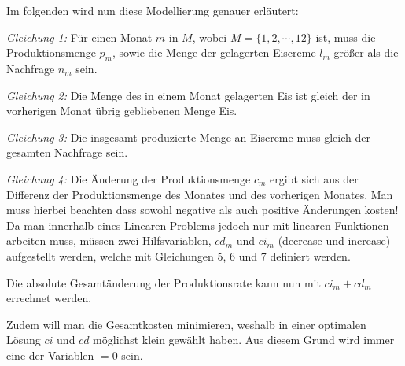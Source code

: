Im folgenden wird nun diese Modellierung genauer erläutert:

\emph{Gleichung 1:} Für einen Monat $m$ in $M$, wobei $M = \{1, 2, \cdots, 12\}$ ist, muss die Produktionsmenge $p_m$, sowie die Menge der gelagerten Eiscreme $l_m$ größer als die Nachfrage $n_m$ sein.

\emph{Gleichung 2:} Die Menge des in einem Monat gelagerten Eis ist gleich der in vorherigen Monat übrig gebliebenen Menge Eis.

\emph{Gleichung 3:} Die insgesamt produzierte Menge an Eiscreme muss gleich der gesamten Nachfrage sein.

\emph{Gleichung 4:} Die Änderung der Produktionsmenge $c_m$ ergibt sich aus der Differenz der Produktionsmenge des Monates und des vorherigen Monates.
Man muss hierbei beachten dass sowohl negative als auch positive Änderungen kosten! Da man innerhalb eines Linearen Problems jedoch nur mit linearen Funktionen arbeiten muss, müssen zwei Hilfsvariablen, $cd_m$ und $ci_m$ (decrease und increase) aufgestellt werden, welche mit Gleichungen 5, 6 und 7 definiert werden.
	
 Die absolute Gesamtänderung der Produktionsrate kann nun mit $ci_m + cd_m$ errechnet werden.

Zudem will man die Gesamtkosten minimieren, weshalb in einer optimalen Lösung $ci$ und $cd$ möglichst klein gewählt haben. Aus diesem Grund wird immer eine der Variablen $= 0$ sein.